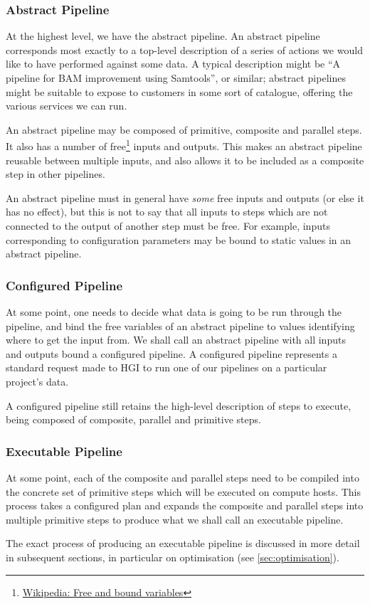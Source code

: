 \documentclass[10pt,a4paper]{article}
\newcommand{\npar}{\par\noindent\space}
\begin{document}
\subsubsection{Abstract Pipeline}
\npar At the highest level, we have the \gls{abstract pipeline}. An abstract pipeline corresponds most exactly to a top-level description of a series of actions we would like to have performed against some data. A typical description might be ``A pipeline for BAM improvement using Samtools'', or similar; abstract pipelines might be suitable to expose to customers in some sort of catalogue, offering the various services we can run.
\npar An abstract pipeline may be composed of primitive, composite and parallel steps. It also has a number of free\footnote{\href{http://en.wikipedia.org/wiki/Free_variables_and_bound_variables}{Wikipedia: Free and bound variables}} inputs and outputs. This makes an abstract pipeline reusable between multiple inputs, and also allows it to be included as a composite step in other pipelines.
\npar An abstract pipeline must in general have \textit{some} free inputs and outputs (or else it has no effect), but this is not to say that all inputs to steps which are not connected to the output of another step must be free. For example, inputs corresponding to configuration parameters may be bound to static values in an abstract pipeline.

\subsubsection{Configured Pipeline}
\npar At some point, one needs to decide what data is going to be run through the pipeline, and bind the free variables of an abstract pipeline to values identifying where to get the input from. We shall call an abstract pipeline with all inputs and outputs bound a \gls{configured pipeline}. A configured pipeline represents a standard request made to HGI to run one of our pipelines on a particular project's data.
\npar A configured pipeline still retains the high-level description of steps to execute, being composed of composite, parallel and primitive steps.

\subsubsection{Executable Pipeline}
\npar At some point, each of the composite and parallel steps need to be compiled into the concrete set of primitive steps which will be executed on compute hosts. This process takes a configured plan and expands the composite and parallel steps into multiple primitive steps to produce what we shall call an \gls{executable pipeline}.
\npar The exact process of producing an executable pipeline is discussed in more detail in subsequent sections, in particular on optimisation (see \ref{sec:optimisation}).
\end{document}
